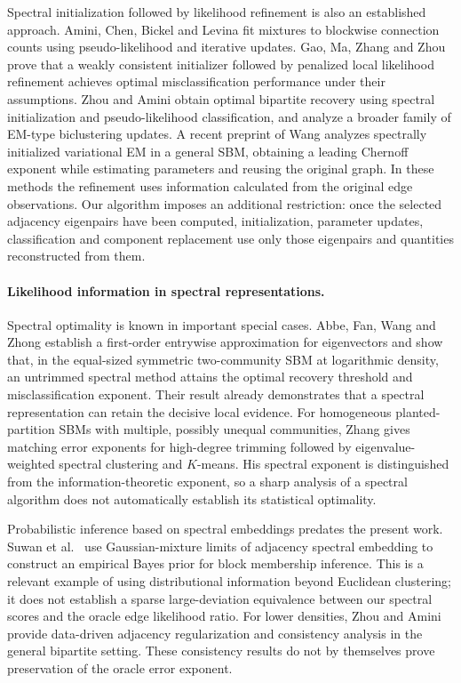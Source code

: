 Spectral initialization followed by likelihood refinement is also an established approach. Amini, Chen, Bickel and Levina \cite{amini2013} fit mixtures to blockwise connection counts using pseudo-likelihood and iterative updates. Gao, Ma, Zhang and Zhou \cite{gao2017} prove that a weakly consistent initializer followed by penalized local likelihood refinement achieves optimal misclassification performance under their assumptions. Zhou and Amini \cite{zhouamini2020} obtain optimal bipartite recovery using spectral initialization and pseudo-likelihood classification, and analyze a broader family of EM-type biclustering updates. A recent preprint of Wang \cite{wang2026vem} analyzes spectrally initialized variational EM in a general SBM, obtaining a leading Chernoff exponent while estimating parameters and reusing the original graph. In these methods the refinement uses information calculated from the original edge observations. Our algorithm imposes an additional restriction: once the selected adjacency eigenpairs have been computed, initialization, parameter updates, classification and component replacement use only those eigenpairs and quantities reconstructed from them.

\paragraph{Likelihood information in spectral representations.}
Spectral optimality is known in important special cases. Abbe, Fan, Wang and Zhong \cite{abbe2020} establish a first-order entrywise approximation for eigenvectors and show that, in the equal-sized symmetric two-community SBM at logarithmic density, an untrimmed spectral method attains the optimal recovery threshold and misclassification exponent. Their result already demonstrates that a spectral representation can retain the decisive local evidence. For homogeneous planted-partition SBMs with multiple, possibly unequal communities, Zhang \cite{zhang2024} gives matching error exponents for high-degree trimming followed by eigenvalue-weighted spectral clustering and $K$-means. His spectral exponent is distinguished from the information-theoretic exponent, so a sharp analysis of a spectral algorithm does not automatically establish its statistical optimality.

Probabilistic inference based on spectral embeddings predates the present work. Suwan et al.\ \cite{suwan2016} use Gaussian-mixture limits of adjacency spectral embedding to construct an empirical Bayes prior for block membership inference. This is a relevant example of using distributional information beyond Euclidean clustering; it does not establish a sparse large-deviation equivalence between our spectral scores and the oracle edge likelihood ratio. For lower densities, Zhou and Amini \cite{zhouamini2019} provide data-driven adjacency regularization and consistency analysis in the general bipartite setting. These consistency results do not by themselves prove preservation of the oracle error exponent.

